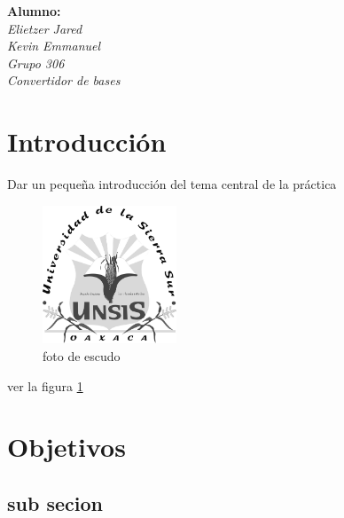 \documentclass[letterpaper,12pt]{extarticle}%
\begin{document}
    \newpage
    \tableofcontents
    \newpage
    
    \begin{center}
    \textbf{ Alumno:}\\[3mm]
    {\it Elietzer Jared}\\[3mm]
    {\it Kevin Emmanuel}\\[3mm]
    {\it Grupo 306}\\[3mm]
    {\it Convertidor de bases}\\[3mm]
    \end{center}
    
    \begin{multicols}{2}


    \section{Introducción}
    
    Dar un pequeña introducción del tema central de la práctica
		\begin{figure}[H]
		\begin{center}
		\includegraphics[width=4cm]{imag//logBN.jpg}
		\caption{foto de escudo}
		\label{figuraBN}
		\end{center}
 		\end{figure}

		ver la figura \ref*{figuraBN}
        
    \section{Objetivos}

	\subsection{sub secion}


\end{multicols}
\end{document}
